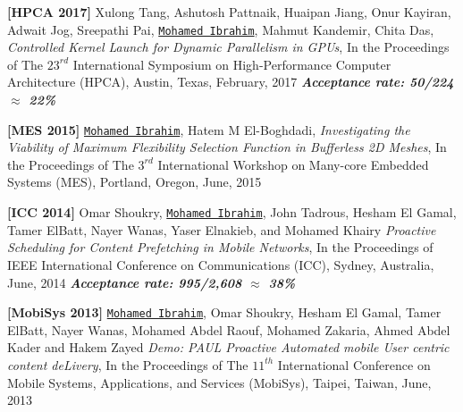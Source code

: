 \documentclass[10pt,a4]{article}
\begin{document}
\begin{description}
\item 
{\bf [HPCA 2017]}
Xulong Tang, Ashutosh Pattnaik, Huaipan Jiang, Onur Kayiran, Adwait Jog, Sreepathi Pai, {\tt \underline{Mohamed Ibrahim}}, Mahmut Kandemir, Chita Das, 
{\it Controlled Kernel Launch for Dynamic Parallelism in GPUs},
In the Proceedings of The $23^{rd}$ International Symposium on High-Performance Computer Architecture (HPCA), 
Austin, Texas, February, 2017
\textbf{\textit{Acceptance rate: 50/224 $\approx$ 22\%}}


\item 
{\bf [MES 2015]}
{\tt \underline{Mohamed Ibrahim}}, Hatem M El-Boghdadi,
{\it Investigating the Viability of Maximum Flexibility Selection Function in Bufferless 2D Meshes},
In the Proceedings of The $3^{rd}$ International Workshop on Many-core Embedded Systems (MES), 
Portland, Oregon, June, 2015

\item
{\bf [ICC 2014]} 
Omar Shoukry, {\tt \underline{Mohamed Ibrahim}}, John Tadrous, Hesham El Gamal, Tamer ElBatt, Nayer Wanas, Yaser Elnakieb, and Mohamed Khairy 
{\it Proactive Scheduling for Content Pre­fetching in Mobile Networks}, 
In the Proceedings of IEEE International Conference on Communications (ICC),
Sydney, Australia, June, 2014
\textbf{\textit{Acceptance rate: 995/2,608 $\approx$ 38\%}} 

\item
{\bf [MobiSys 2013]} 
{\tt \underline{Mohamed Ibrahim}}, Omar Shoukry, Hesham El Gamal, Tamer ElBatt, Nayer Wanas, Mohamed Abdel Raouf, Mohamed Zakaria, Ahmed Abdel Kader and Hakem Zayed 
{\it Demo: PAUL­ Proactive Automated mobile User centric content deLivery}, 
In the Proceedings of The $11^{th}$ International Conference on Mobile Systems, Applications, and Services (MobiSys), 
Taipei, Taiwan, June, 2013

\end{description}


\end{document}
